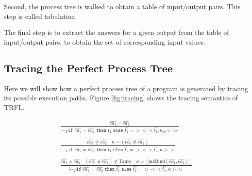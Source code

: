 \documentclass[10pt]{../sigplanconf}
\newcommand{\nfrac}[2]{\frac{\displaystyle{#1}}{\displaystyle{#2}}}
\newcommand{\tagsc}[1]{\tag{\scshape #1}}
\begin{document}
Second, the process tree is walked to obtain a table of input/output
pairs. This step is called tabulation.

The final step is to extract the answers for a given output from the
table of input/output pairs, to obtain the set of corresponding input
values.


\subsection{Tracing the Perfect Process Tree}
Here we will show how a perfect process tree of a program is generated
by tracing its possible execution paths. Figure \ref{fig:tracing}
shows the tracing semantics of TRFL.

\begin{figure}
  \begin{align}
    \nfrac{
      \widehat{ea_1} = \widehat{ea_2}
    }{
      |-_\Gamma \texttt{if $\widehat{ea_1}$ = $\widehat{ea_2}$ then $\widehat{t_1}$ else $\widehat{t_2}$} => <<\widehat{t_1}, \kappa_{id}>>
    } \tagsc{If-Eq}
\\\nonumber\\
    \nfrac{
      \widehat{ea_1} \neq \widehat{ea_2} \quad \kappa = (\widehat{ea_1}\ \#\ \widehat{ea_2})
    }{
      |-_\Gamma \texttt{if $\widehat{ea_1}$ = $\widehat{ea_2}$ then $\widehat{t_1}$ else $\widehat{t_2}$} => <<\widehat{t_2}, \kappa>>
    } \tagsc{If-Neq-False}
\\\nonumber\\
    \nfrac{
      \widehat{ea_1} \neq \widehat{ea_2} \quad (\widehat{ea_1}\ \#\ \widehat{ea_2}) \not \in \textrm{Tauto} \quad \kappa = [\textrm{mkBind}(\widehat{ea_1}, \widehat{ea_2})]
    }{
      |-_\Gamma \texttt{if $\widehat{ea_1}$ = $\widehat{ea_2}$ then $\widehat{t_1}$ else $\widehat{t_2}$} => <<\widehat{t_1}, \kappa>>
    } \tagsc{If-Neq-True}
  \end{align}

  ~\newline


\end{figure}
\end{document}
